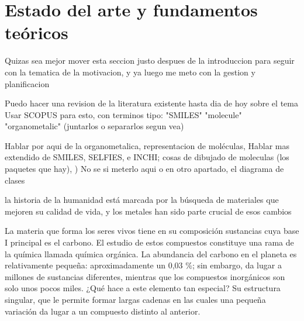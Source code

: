 \chapter{Estado del arte y fundamentos teóricos}

Quizas sea mejor mover esta seccion justo despues de la introduccion para seguir con la tematica de la motivacion, y ya luego me meto con la gestion y planificacion

Puedo hacer una revision de la literatura existente hasta dia de hoy sobre el tema
Usar SCOPUS para esto, con terminos tipo: "SMILES" "molecule" "organometalic" (juntarlos o separarlos segun vea)

Hablar por aqui de la organometalica, representacion de moléculas, Hablar mas extendido de SMILES, SELFIES, e INCHI; cosas de dibujado de moleculas (los paquetes que hay), )
No se si meterlo aqui o en otro apartado, el diagrama de clases

la historia de la humanidad está marcada por la búsqueda de materiales que mejoren su calidad de vida, y los metales han sido parte crucial de esos cambios 

La materia que forma los seres vivos tiene en su composición sustancias cuya base I principal es el carbono. El estudio de estos compuestos constituye una rama de la química llamada química orgánica. La abundancia del carbono en el planeta es relativamente pequeña: aproximadamente un 0,03 \%; sin embargo, da lugar a millones de sustancias diferentes, mientras que los compuestos inorgánicos son solo unos pocos miles. ¿Qué hace a este elemento tan especial? Su estructura singular, que le permite formar largas cadenas en las cuales una pequeña variación da lugar a un compuesto distinto al anterior.

\bigskip